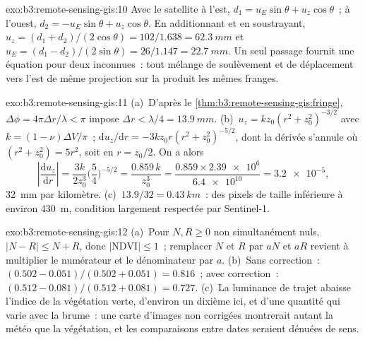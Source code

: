 \begin{solution}{exo:b3:remote-sensing-gis:10}
Avec le satellite à l'est, $d_1 = u_E\sin\theta + u_z\cos\theta$~; à
l'ouest, $d_2 = -u_E\sin\theta + u_z\cos\theta$. En additionnant et en soustrayant,
$u_z = (d_1 + d_2)/(2\cos\theta) = 102/1.638 = \qty{62.3}{mm}$ et $u_E =
(d_1 - d_2)/(2\sin\theta) = 26/1.147 = \qty{22.7}{mm}$. Un seul passage fournit une
équation pour deux inconnues~: tout mélange de soulèvement et de déplacement vers l'est
de même projection sur la  produit les mêmes franges.
\end{solution}

\begin{solution}{exo:b3:remote-sensing-gis:11}
(a)~D'après le \cref{thm:b3:remote-sensing-gis:fringe}, $\Delta\phi =
4\pi\Delta r/\lambda < \pi$ impose $\Delta r < \lambda/4 =
\qty{13.9}{mm}$. (b)~$u_z = k z_0(r^2 + z_0^2)^{-3/2}$ avec $k = (1 -
\nu)\Delta V/\pi$~; $\mathrm du_z/\mathrm dr = -3kz_0r(r^2 + z_0^2)^{-5/2}$,
dont la dérivée s'annule où $(r^2 + z_0^2) = 5r^2$, soit en $r = z_0/2$. On a alors
\[
\left|\frac{\mathrm du_z}{\mathrm dr}\right| = \frac{3k}{2z_0^3}\Big(\frac54\Big)^{-5/2}
= \frac{0.859\,k}{z_0^3} = \frac{0.859\times\num{2.39e6}}{\num{6.4e10}} = \num{3.2e-5},
\]
\qty{32}{mm} par kilomètre. (c)~$13.9/32 = \qty{0.43}{km}$~: des pixels de taille inférieure
à environ \qty{430}{m}, condition largement respectée par Sentinel-1.
\end{solution}

\begin{solution}{exo:b3:remote-sensing-gis:12}
(a)~Pour $N, R \ge 0$ non simultanément nuls, $|N - R| \le N + R$, donc $|\mathrm{NDVI}|
\le 1$~; remplacer $N$ et $R$ par $aN$ et $aR$ revient à multiplier le numérateur et
le dénominateur par $a$. (b)~Sans correction~: $(0.502 - 0.051)/(0.502 + 0.051) =
0.816$~; avec correction~: $(0.512 - 0.081)/(0.512 + 0.081) = 0.727$. (c)~La luminance de
trajet abaisse l'indice de la végétation verte, d'environ un dixième ici, et
d'une quantité qui varie avec la brume~: une carte d'images non corrigées
montrerait autant la météo que la végétation, et les comparaisons entre dates
seraient dénuées de sens.
\end{solution}

